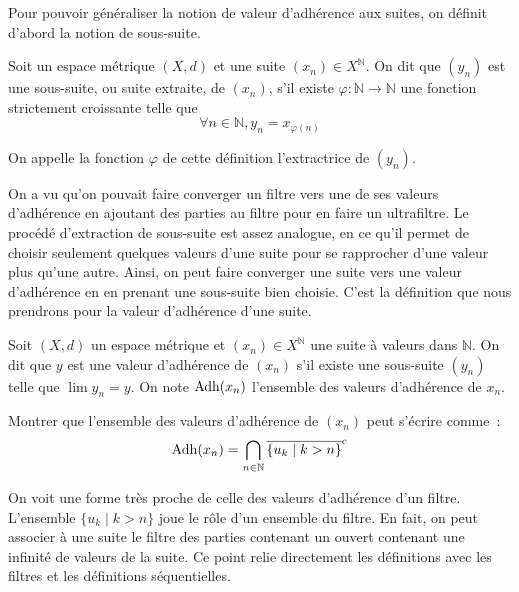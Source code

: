 Pour pouvoir généraliser la notion de valeur d'adhérence aux suites, on définit
d'abord la notion de sous-suite.

\begin{definition}
  Soit un espace métrique $(X,d)$ et une suite $(x_n)\in X^\mathbb N$. On dit
  que $(y_n)$ est une sous-suite, ou suite extraite, de $(x_n)$, s'il existe
  $\varphi : \mathbb N \to \mathbb N$ une fonction strictement croissante
  telle que
  \[\forall n \in \mathbb N, y_n = x_{\varphi(n)}\]

  On appelle la fonction $\varphi$ de cette définition l'extractrice de
  $(y_n)$.
\end{definition}

On a vu qu'on pouvait faire converger un filtre vers une de ses valeurs
d'adhérence en ajoutant des parties au filtre pour en faire un ultrafiltre.
Le procédé d'extraction de sous-suite est assez analogue, en ce qu'il permet
de choisir seulement quelques valeurs d'une suite pour se rapprocher d'une
valeur plus qu'une autre. Ainsi, on peut faire converger une suite vers une
valeur d'adhérence en en prenant une sous-suite bien choisie. C'est la
définition que nous prendrons pour la valeur d'adhérence d'une suite.

\begin{definition}
  Soit $(X,d)$ un espace métrique et $(x_n)\in X^\mathbb N$ une suite à
  valeurs dans $\mathbb N$. On dit que $y$ est une valeur d'adhérence de
  $(x_n)$ s'il existe une sous-suite $(y_n)$ telle que $\lim y_n = y$. On
  note $\operatorname{Adh}(x_n)$ l'ensemble des valeurs d'adhérence de $x_n$.
\end{definition}

\begin{exercise}\label{exo.adh.fil.metr}
  Montrer que l'ensemble des valeurs d'adhérence de $(x_n)$ peut s'écrire
  comme~:
  \[\operatorname{Adh}(x_n) = \bigcap_{n \in \mathbb N} \overline{\{u_k \mid k > n\}}^{\mathrm c}\]
\end{exercise}

\begin{remark}
  On voit une forme très proche de celle des valeurs d'adhérence d'un filtre.
  L'ensemble $\{u_k \mid k > n\}$ joue le rôle d'un ensemble du filtre. En
  fait, on peut associer à une suite le filtre des parties contenant un ouvert
  contenant une infinité de valeurs de la suite. Ce point relie directement
  les définitions avec les filtres et les définitions séquentielles.
\end{remark}

